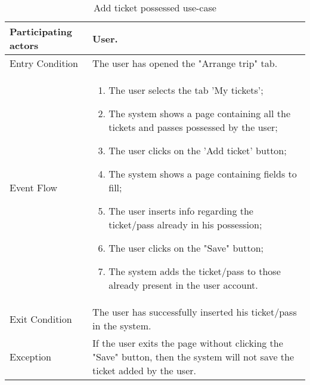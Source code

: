 \begin{table}[H]
	\begin{center}
		\begin{tabular}{ | p{} | p{} | }
		\hline
		Participating actors & User.\\
		\hline
		Entry Condition & The user has opened the "Arrange trip" tab.\\
		\hline
		Event Flow & 
			\begin{enumerate}
				\item The user selects the tab 'My tickets';
				\item The system shows a page containing all the tickets and passes possessed by the user;
				\item The user clicks on the 'Add ticket' button;
				\item The system shows a page containing fields to fill;
				\item The user inserts info regarding the ticket/pass already in his possession;
				\item The user clicks on the "Save" button;
				\item The system adds the ticket/pass to those already present in the user account.
			\end{enumerate} \\
		\hline
		Exit Condition & The user has successfully inserted his ticket/pass in the system.\\
		\hline
		Exception & If the user exits the page without clicking the "Save" button, then the system will not save the ticket added by the user.\\ 
		\hline
		\end{tabular}
	\end{center}
	\caption{Add ticket possessed use-case}
\end{table}